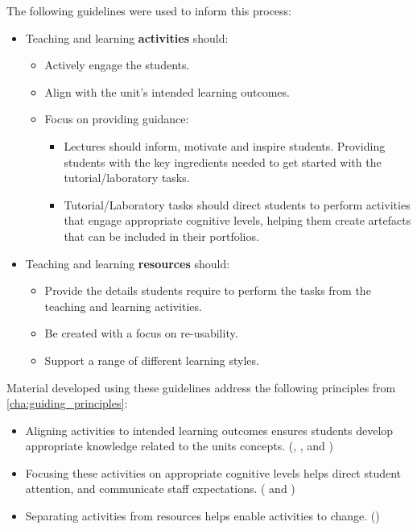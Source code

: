 %
% 

The following guidelines were used to inform this process:

\begin{itemize}[noitemsep,nolistsep]
	\item Teaching and learning \textbf{activities} should:
	\begin{itemize}[noitemsep,nolistsep]
	 	\item Actively engage the students.
	 	\item Align with the unit's intended learning outcomes.
	 	\item Focus on providing guidance:
	 	\begin{itemize}[noitemsep,nolistsep]
		 	\item Lectures should inform, motivate and inspire students. Providing students with the key ingredients needed to get started with the tutorial/laboratory tasks.
		 	\item Tutorial/Laboratory tasks should direct students to perform activities that engage appropriate cognitive levels, helping them create artefacts that can be included in their portfolios.
	 	\end{itemize}
	 \end{itemize} 

	\item Teaching and learning \textbf{resources} should:
	\begin{itemize}[noitemsep,nolistsep]
		\item Provide the details students require to perform the tasks from the teaching and learning activities.
		\item Be created with a focus on re-usability.
		\item Support a range of different learning styles.
	\end{itemize}
\end{itemize}

Material developed using these guidelines address the following principles from \cref{cha:guiding_principles}:

\begin{itemize}[noitemsep,nolistsep]
	\item Aligning activities to intended learning outcomes ensures students develop appropriate knowledge related to the units concepts. (, , and )
	\item Focusing these activities on appropriate cognitive levels helps direct student attention, and communicate staff expectations. ( and )
	\item Separating activities from resources helps enable activities to change. ()
\end{itemize}


